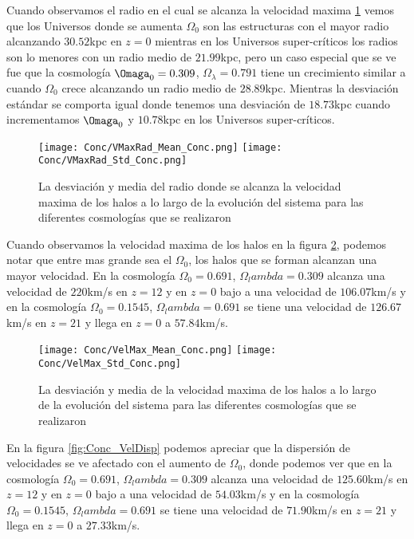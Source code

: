 Cuando observamos el radio en el cual se alcanza la velocidad maxima \ref{fig:Conc_VMaxRad} vemos que los Universos donde se aumenta $\Omega_0$ son las estructuras con el mayor radio alcanzando $30.52$kpc en $z=0$ mientras en los Universos super-críticos los radios son lo menores con un radio medio de $21.99$kpc, pero un caso especial que se ve fue que la cosmología $\Omaga_0 =0.309$, $\Omega_\lambda=0.791$ tiene un crecimiento similar a cuando $\Omega_0$ crece alcanzando  un radio medio de $28.89$kpc. Mientras la desviación estándar se comporta igual donde tenemos una desviación de $18.73$kpc cuando incrementamos $\Omaga_0$ y $10.78$kpc en los Universos super-críticos.

\begin{figure}
      \centering
      \texttt{[image: Conc/VMaxRad\_Mean\_Conc.png]}
      \texttt{[image: Conc/VMaxRad\_Std\_Conc.png]}
      \caption[Evolución de la desviación y media del radio donde se alcanza la velocidad maxima de los halos para todas las cosmologías]{La desviación y media del radio donde se alcanza la velocidad maxima de los halos a lo largo de la evolución del sistema para las diferentes cosmologías que se realizaron}
      \label{fig:Conc_VMaxRad}
\end{figure}

Cuando observamos la velocidad maxima de los halos en la figura \ref{fig:Conc_VelMax}, podemos notar que entre mas grande sea el $\Omega_0$, los halos que se forman alcanzan una mayor velocidad. En la cosmología $\Omega_0 = 0.691$, $\Omega_lambda = 0.309$ alcanza una velocidad de $220$km/s en $z=12$ y en $z=0$ bajo a una velocidad de $106.07$km/s y en la cosmología  $\Omega_0 = 0.1545$, $\Omega_lambda = 0.691$ se tiene una velocidad de $126.67$km/s en $z=21$ y llega en $z=0$ a $57.84$km/s.

\begin{figure}
      \centering
      \texttt{[image: Conc/VelMax\_Mean\_Conc.png]}
      \texttt{[image: Conc/VelMax\_Std\_Conc.png]}
      \caption[Evolución de la desviación y media de la velocidad maxima de los halos para todas las cosmologías]{La desviación y media de la velocidad maxima de los halos a lo largo de la evolución del sistema para las diferentes cosmologías que se realizaron}
      \label{fig:Conc_VelMax}
\end{figure}

En la figura \ref{fig:Conc_VelDisp} podemos apreciar que la dispersión de velocidades se ve afectado con el aumento de $\Omega_0$, donde podemos ver que en la cosmología $\Omega_0 = 0.691$, $\Omega_lambda = 0.309$ alcanza una velocidad de $125.60$km/s en $z=12$ y en $z=0$ bajo a una velocidad de $54.03$km/s y en la cosmología  $\Omega_0 = 0.1545$, $\Omega_lambda = 0.691$ se tiene una velocidad de $71.90$km/s en $z=21$ y llega en $z=0$ a $27.33$km/s. 

